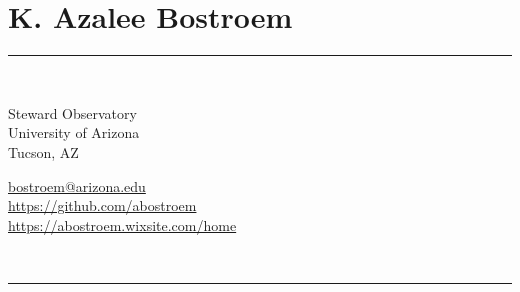 \documentclass[10pt]{cv}
\begin{document}
 
\thispagestyle{empty}
\section{{\LARGE \bf{K. Azalee Bostroem}}}
{\rule{\linewidth}{0.5mm}} \\
\begin{minipage}{0.6\textwidth}
Steward Observatory\\
University of Arizona \\
Tucson, AZ
\end{minipage}
\begin{minipage}{0.4\textwidth}
\begin{flushright}
\vspace{0.25cm}
\color{blue}\url{bostroem@arizona.edu}\\
\color{blue}\url{https://github.com/abostroem} \\
\color{blue}\url{https://abostroem.wixsite.com/home}
\end{flushright}
\end{minipage} \\
{\rule{\linewidth}{0.5mm}} 
\vspace{-.5em}
\end{document}
